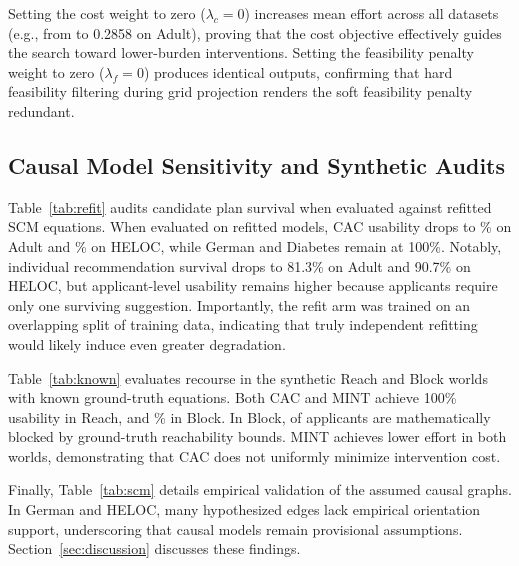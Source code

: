 \documentclass[nolineno]{paper/ieee-access/ieeeaccess}%
\newcommand{\CAC}{CAC}
\begin{document}
Setting the cost weight to zero ($\lambda_c=0$) increases mean effort across all datasets (e.g., from \AdultCacCost{} to 0.2858 on Adult), proving that the cost objective effectively guides the search toward lower-burden interventions. Setting the feasibility penalty weight to zero ($\lambda_f=0$) produces identical outputs, confirming that hard feasibility filtering during grid projection renders the soft feasibility penalty redundant.

\begin{table}[t]
\caption{Tests with parts removed, using the main seed. $U$ is applicant
usability in percent. Cost columns show the mean effort of the cheapest
usable plan. ``Ratio'' divides the no-cost-term mean by the full-method
mean. It is not the project's median Cost/CAC measure.}
\label{tab:ablation}
\centering\footnotesize\setlength{\tabcolsep}{3pt}

\end{table}

\subsection{Causal Model Sensitivity and Synthetic Audits}
Table~\ref{tab:refit} audits candidate plan survival when evaluated against refitted SCM equations. When evaluated on refitted models, \CAC{} usability drops to \AdultRefitUsable\% on Adult and \HelocRefitUsable\% on HELOC, while German and Diabetes remain at 100\%. Notably, individual recommendation survival drops to 81.3\% on Adult and 90.7\% on HELOC, but applicant-level usability remains higher because applicants require only one surviving suggestion. Importantly, the refit arm was trained on an overlapping split of training data, indicating that truly independent refitting would likely induce even greater degradation.

Table~\ref{tab:known} evaluates recourse in the synthetic Reach and Block worlds with known ground-truth equations. Both \CAC{} and MINT achieve 100\% usability in Reach, and \BlockCacUsable\% in Block. In Block, \BlockUnreachable{} of \BlockApplicants{} applicants are mathematically blocked by ground-truth reachability bounds. MINT achieves lower effort in both worlds, demonstrating that \CAC{} does not uniformly minimize intervention cost.

Finally, Table~\ref{tab:scm} details empirical validation of the assumed causal graphs. In German and HELOC, many hypothesized edges lack empirical orientation support, underscoring that causal models remain provisional assumptions. Section~\ref{sec:discussion} discusses these findings.
\end{document}

